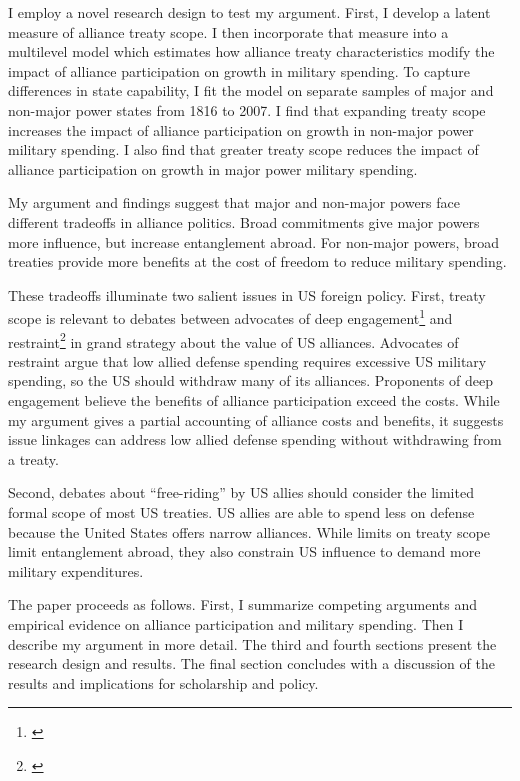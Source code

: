 \documentclass[12pt]{article}
\begin{document}
I employ a novel research design to test my argument.
First, I develop a latent measure of alliance treaty scope. 
I then incorporate that measure into a multilevel model which estimates how alliance treaty characteristics modify the impact of alliance participation on growth in military spending.
To capture differences in state capability, I fit the model on separate samples of major and non-major power states from 1816 to 2007. 
I find that expanding treaty scope increases the impact of alliance participation on growth in non-major power military spending.
I also find that greater treaty scope reduces the impact of alliance participation on growth in major power military spending. 


My argument and findings suggest that major and non-major powers face different tradeoffs in alliance politics.
Broad commitments give major powers more influence, but increase entanglement abroad.
For non-major powers, broad treaties provide more benefits at the cost of freedom to reduce military spending. 


These tradeoffs illuminate two salient issues in US foreign policy. 
First, treaty scope is relevant to debates between advocates of deep engagement\footnote{\cite{Brooksetal2013}} and restraint\footnote{\cite{Posen2014}} in grand strategy about the value of US alliances. 
Advocates of restraint argue that low allied defense spending requires excessive US military spending, so the US should withdraw many of its alliances.
Proponents of deep engagement believe the benefits of alliance participation exceed the costs. 
While my argument gives a partial accounting of alliance costs and benefits, it suggests issue linkages can address low allied defense spending without withdrawing from a treaty.  


Second, debates about ``free-riding'' by US allies should consider the limited formal scope of most US treaties. 
US allies are able to spend less on defense because the United States offers narrow alliances. 
While limits on treaty scope limit entanglement abroad, they also constrain US influence to demand more military expenditures. 


The paper proceeds as follows. 
First, I summarize competing arguments and empirical evidence on alliance participation and military spending. 
Then I describe my argument in more detail. 
The third and fourth sections present the research design and results. 
The final section concludes with a discussion of the results and implications for scholarship and policy.  
\end{document}
